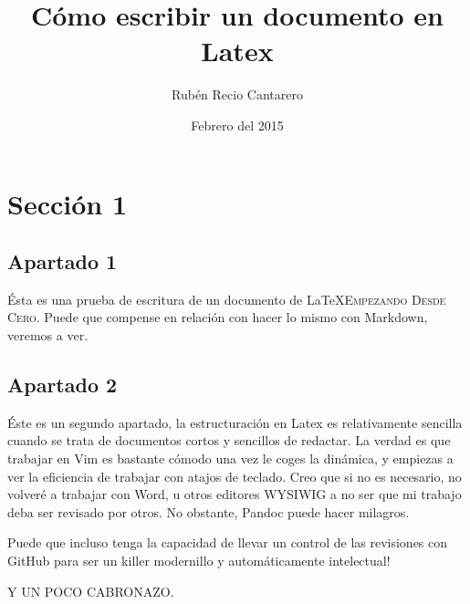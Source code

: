 \documentclass[11pt]{article}
\begin{document}
\title{Cómo escribir un documento en Latex}
\author{Rubén Recio Cantarero}
\date{Febrero del 2015}
\maketitle

\clearpage


\clearpage

\section{Sección 1}
\subsection{Apartado 1}

Ésta es una prueba de escritura de un documento de \LaTeX \textsc{Empezando Desde Cero}. Puede que compense en relación con hacer lo mismo con Markdown, veremos a ver.

\subsection{Apartado 2}
Éste es un segundo apartado, la estructuración en Latex es relativamente sencilla cuando se trata de documentos cortos y sencillos de redactar. La verdad es que trabajar en Vim es bastante cómodo una vez le coges la dinámica, y empiezas a ver la eficiencia de trabajar con atajos de teclado. Creo que si no es necesario, no volveré a trabajar con Word, u otros editores WYSIWIG a no ser que mi trabajo deba ser revisado por otros. No obstante, Pandoc puede hacer milagros.

Puede que incluso tenga la capacidad de llevar un control de las revisiones con GitHub para ser un killer modernillo y automáticamente intelectual!

Y UN POCO CABRONAZO.
\end{document}
